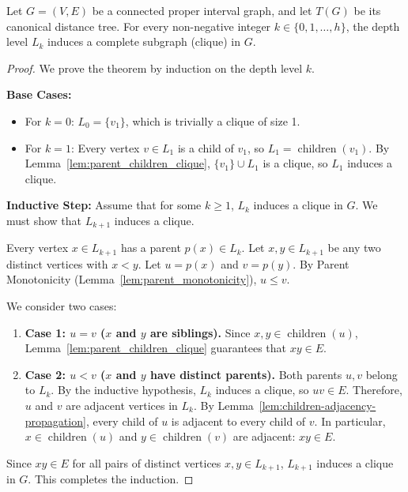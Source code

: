 \begin{theorem}
\label{thm:depth-level-clique}
Let $G = (V, E)$ be a connected proper interval graph, and let $T(G)$ be its canonical distance tree. For every non-negative integer $k \in \{0, 1, \dots, h\}$, the depth level $L_k$ induces a complete subgraph (clique) in $G$.
\end{theorem}
\begin{proof}
We prove the theorem by induction on the depth level $k$.

\textbf{Base Cases:}
\begin{itemize}
    \item For $k = 0$: $L_0 = \{v_1\}$, which is trivially a clique of size 1.
    \item For $k = 1$: Every vertex $v \in L_1$ is a child of $v_1$, so $L_1 = \operatorname{children}(v_1)$. By Lemma~\ref{lem:parent_children_clique}, $\{v_1\} \cup L_1$ is a clique, so $L_1$ induces a clique.
\end{itemize}

\textbf{Inductive Step:}
Assume that for some $k \ge 1$, $L_k$ induces a clique in $G$. We must show that $L_{k+1}$ induces a clique.

Every vertex $x \in L_{k+1}$ has a parent $p(x) \in L_k$. Let $x, y \in L_{k+1}$ be any two distinct vertices with $x < y$. Let $u = p(x)$ and $v = p(y)$. By Parent Monotonicity (Lemma~\ref{lem:parent_monotonicity}), $u \le v$.

We consider two cases:
\begin{enumerate}
    \item \textbf{Case 1: $u = v$ ($x$ and $y$ are siblings).}
    Since $x, y \in \operatorname{children}(u)$, Lemma~\ref{lem:parent_children_clique} guarantees that $xy \in E$.
    
    \item \textbf{Case 2: $u < v$ ($x$ and $y$ have distinct parents).}
    Both parents $u, v$ belong to $L_k$. By the inductive hypothesis, $L_k$ induces a clique, so $uv \in E$. Therefore, $u$ and $v$ are adjacent vertices in $L_k$. By Lemma~\ref{lem:children-adjacency-propagation}, every child of $u$ is adjacent to every child of $v$. In particular, $x \in \operatorname{children}(u)$ and $y \in \operatorname{children}(v)$ are adjacent: $xy \in E$.
\end{enumerate}

Since $xy \in E$ for all pairs of distinct vertices $x, y \in L_{k+1}$, $L_{k+1}$ induces a clique in $G$. This completes the induction.
\end{proof}

